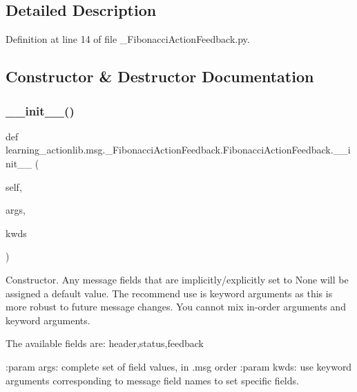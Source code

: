 \subsection{Detailed Description}


Definition at line 14 of file \+\_\+\+Fibonacci\+Action\+Feedback.\+py.



\subsection{Constructor \& Destructor Documentation}
\mbox{\label{classlearning__actionlib_1_1msg_1_1__FibonacciActionFeedback_1_1FibonacciActionFeedback_a9835b9bd3dfddf920b7949117ad5de8d}} 
\subsubsection{\texorpdfstring{\+\_\+\+\_\+init\+\_\+\+\_\+()}{\_\_init\_\_()}}
{\footnotesize\ttfamily def learning\+\_\+actionlib.\+msg.\+\_\+\+Fibonacci\+Action\+Feedback.\+Fibonacci\+Action\+Feedback.\+\_\+\+\_\+init\+\_\+\+\_\+ (\begin{DoxyParamCaption}\item[{}]{self,  }\item[{}]{args,  }\item[{}]{kwds }\end{DoxyParamCaption})}

\begin{DoxyVerb}Constructor. Any message fields that are implicitly/explicitly
set to None will be assigned a default value. The recommend
use is keyword arguments as this is more robust to future message
changes.  You cannot mix in-order arguments and keyword arguments.

The available fields are:
   header,status,feedback

:param args: complete set of field values, in .msg order
:param kwds: use keyword arguments corresponding to message field names
to set specific fields.
\end{DoxyVerb}
 

